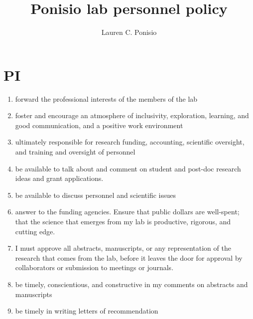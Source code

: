 \documentclass[12pt]{article}
\title{Ponisio lab personnel policy}
\author{Lauren C. Ponisio}
\begin{document}
\maketitle

\section{PI}
\begin{enumerate}
\item forward the professional interests of the members of the lab
\item foster and encourage an atmosphere of inclusivity, exploration,
  learning, and good communication, and a positive work environment
\item ultimately responsible for research funding, accounting,
  scientific oversight, and training and oversight of personnel
\item be available to talk about and comment on student and post-doc
  research ideas and grant applications.
\item be available to discuss personnel and scientific issues
\item answer to the funding agencies. Ensure that public dollars are
  well-spent; that the science that emerges from my lab is productive,
  rigorous, and cutting edge.
\item I must approve all abstracts, manuscripts, or any representation
  of the research that comes from the lab, before it leaves the door
  for approval by collaborators or submission to meetings or journals.
\item be timely, conscientious, and constructive in my comments on
  abstracts and manuscripts
\item be timely in writing letters of recommendation
\end{enumerate}
\end{document}
